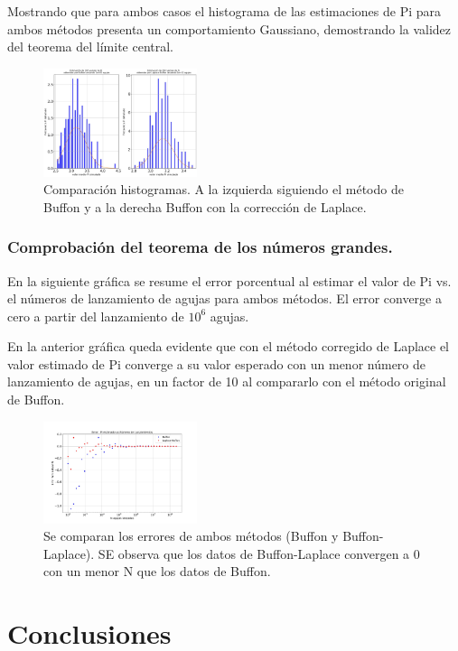 \documentclass{rbf}
\begin{document}
Mostrando que para ambos casos el histograma de las estimaciones de Pi para ambos métodos presenta un comportamiento Gaussiano, demostrando la validez del teorema del límite central.
\begin{figure}[h]
 \centering
  \includegraphics[width=0.4\textwidth]{figures/pi_N1.000e+02k200.jpg}
	\caption{Comparación histogramas. A la izquierda siguiendo el método de Buffon y a la derecha Buffon con la corrección de Laplace. }
 \label{buff10}
\end{figure}
\subsubsection{Comprobación del teorema de los números grandes.}
En la siguiente gráfica se resume el error porcentual al estimar el valor de Pi vs. el números de lanzamiento de agujas para ambos métodos. El error converge a cero a partir del lanzamiento de $10^6$ agujas.

En la anterior gráfica queda evidente que con el método corregido de Laplace el valor estimado de Pi converge a su valor esperado con un menor número de lanzamiento de agujas, en un factor de 10 al compararlo con el método original de Buffon. 
\begin{figure}[h]
 \centering
  \includegraphics[width=0.4\textwidth]{figures/Errores.jpg}
	\caption{Se comparan los errores de ambos métodos (Buffon y Buffon-Laplace). SE observa que los datos de Buffon-Laplace convergen a 0 con un menor N que los datos de Buffon.}
 \label{buff11}
\end{figure}

\section{Conclusiones}
\end{document}
